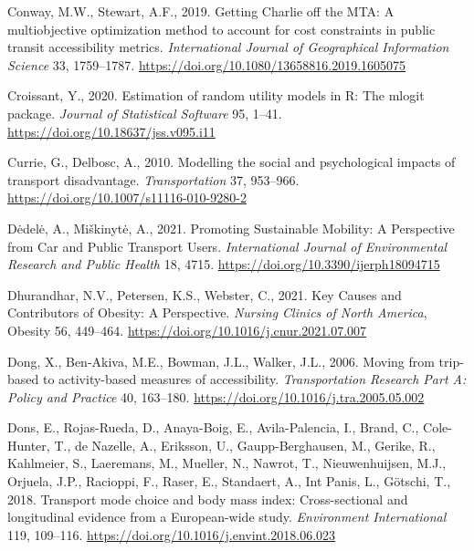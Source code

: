 \documentclass[
  letterpaper,
  DIV=11,
  numbers=noendperiod]{scrreport}
\newlength{\cslhangindent}
\newlength{\cslentryspacingunit} %
\newenvironment{CSLReferences}[2] %
 {%
  \setlength{\parindent}{0pt}
  \ifodd #1
  \let\oldpar\par
  \def\par{\hangindent=\cslhangindent\oldpar}
  \fi
  \setlength{\parskip}{#2\cslentryspacingunit}
 }%
 {}
\begin{document}
\begin{CSLReferences}{1}{0}
\leavevmode{}%
Conway, M.W., Stewart, A.F., 2019. Getting {Charlie} off the {MTA}: A
multiobjective optimization method to account for cost constraints in
public transit accessibility metrics. \emph{International Journal of
Geographical Information Science} 33, 1759--1787.
\url{https://doi.org/10.1080/13658816.2019.1605075}

\leavevmode{}%
Croissant, Y., 2020. Estimation of random utility models in {R}: The
{mlogit} package. \emph{Journal of Statistical Software} 95, 1--41.
\url{https://doi.org/10.18637/jss.v095.i11}

\leavevmode{}%
Currie, G., Delbosc, A., 2010. Modelling the social and psychological
impacts of transport disadvantage. \emph{Transportation} 37, 953--966.
\url{https://doi.org/10.1007/s11116-010-9280-2}

\leavevmode{}%
Dėdelė, A., Miškinytė, A., 2021. Promoting {Sustainable Mobility}: {A
Perspective} from {Car} and {Public Transport Users}.
\emph{International Journal of Environmental Research and Public Health}
18, 4715. \url{https://doi.org/10.3390/ijerph18094715}

\leavevmode{}%
Dhurandhar, N.V., Petersen, K.S., Webster, C., 2021. Key {Causes} and
{Contributors} of {Obesity}: {A Perspective}. \emph{Nursing Clinics of
North America}, Obesity 56, 449--464.
\url{https://doi.org/10.1016/j.cnur.2021.07.007}

\leavevmode{}%
Dong, X., Ben-Akiva, M.E., Bowman, J.L., Walker, J.L., 2006. Moving from
trip-based to activity-based measures of accessibility.
\emph{Transportation Research Part A: Policy and Practice} 40, 163--180.
\url{https://doi.org/10.1016/j.tra.2005.05.002}

\leavevmode{}%
Dons, E., Rojas-Rueda, D., Anaya-Boig, E., Avila-Palencia, I., Brand,
C., Cole-Hunter, T., de Nazelle, A., Eriksson, U., Gaupp-Berghausen, M.,
Gerike, R., Kahlmeier, S., Laeremans, M., Mueller, N., Nawrot, T.,
Nieuwenhuijsen, M.J., Orjuela, J.P., Racioppi, F., Raser, E., Standaert,
A., Int Panis, L., Götschi, T., 2018. Transport mode choice and body
mass index: {Cross-sectional} and longitudinal evidence from a
{European-wide} study. \emph{Environment International} 119, 109--116.
\url{https://doi.org/10.1016/j.envint.2018.06.023}


\end{CSLReferences}
\end{document}
